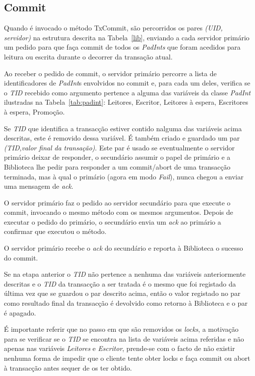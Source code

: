 \subsection{Commit}

Quando é invocado o método TxCommit, são percorridos os pares \textit{(UID, servidor)} na estrutura descrita na Tabela~\ref{lib}, enviando a cada servidor primário um pedido para que faça commit de todos os \textit{PadInts} que foram acedidos para leitura ou escrita durante o decorrer da transação atual.

Ao receber o pedido de commit, o servidor primário percorre a lista de identificadores de \textit{PadInt}s envolvidos no commit e, para cada um deles, verifica se o \textit{TID} recebido como argumento pertence a alguma das variáveis da classe \textit{PadInt} ilustradas na Tabela~\ref{tab:padint}: Leitores, Escritor, Leitores à espera, Escritores à espera, Promoção.

Se \textit{TID} que identifica a transacção estiver contido nalguma das variáveis acima descritas, este é removido dessa variável. É também criado e guardado um par \textit{(TID,valor final da transação)}. Este par é usado se eventualmente o servidor primário deixar de responder, o secundário assumir o papel de primário e a Biblioteca lhe pedir para responder a um commit/abort de uma transacção terminada, mas à qual o primário (agora em modo \textit{Fail}), nunca chegou a enviar uma mensagem de \textit{ack}.

O servidor primário faz o pedido ao servidor secundário para que execute o commit, invocando o mesmo método com os mesmos argumentos. Depois de executar o pedido do primário, o secundário envia um \textit{ack} ao primário a confirmar que executou o método.

O servidor primário recebe o \textit{ack} do secundário e reporta à Biblioteca o sucesso do commit.

Se na etapa anterior o \textit{TID} não pertence a nenhuma das variáveis anteriormente descritas e o \textit{TID} da transacção a ser tratada é o mesmo que foi registado da última vez que se guardou o par descrito acima, então o valor registado no par como resultado final da transacção é devolvido como retorno à Biblioteca e o par é apagado.

É importante referir que no passo em que são removidos os \textit{locks}, a motivação para se verificar se o \textit{TID} se encontra na lista de variáveis acima referidas e não apenas nas variáveis \textit{Leitores} e \textit{Escritor}, prende-se com o facto de não existir nenhuma forma de impedir que o cliente tente obter locks e faça commit ou abort à transacção antes sequer de os ter obtido.
